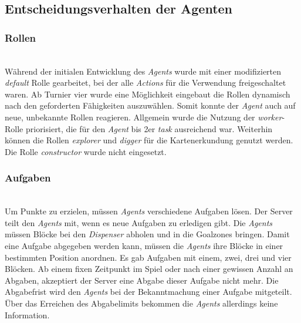 \subsection{Entscheidungsverhalten der Agenten} \label{kap:entscheidungAgenten}

\subsubsection{Rollen} ~\\
Während der initialen Entwicklung des \textit{Agents} wurde mit einer modifizierten \textit{default} Rolle gearbeitet, bei der alle \textit{Actions} für die Verwendung freigeschaltet waren. Ab Turnier vier wurde eine Möglichkeit eingebaut die Rollen dynamisch nach den geforderten Fähigkeiten auszuwählen. 
Somit konnte der \textit{Agent} auch auf neue, unbekannte Rollen reagieren. Allgemein wurde die Nutzung der \textit{worker}-Rolle priorisiert, die für den \textit{Agent} bis 2er \textit{task} ausreichend war. Weiterhin können die Rollen  \textit{explorer} und  \textit{digger} für die Kartenerkundung genutzt werden. Die Rolle \textit{constructor} wurde nicht eingesetzt.

\subsubsection{Aufgaben} ~\\
Um Punkte zu erzielen, müssen \textit{Agents} verschiedene Aufgaben lösen. Der Server teilt den \textit{Agents} mit, wenn es neue Aufgaben zu erledigen gibt. Die \textit{Agents} müssen Blöcke bei den \textit{Dispenser} abholen und in die Goalzones bringen. Damit eine Aufgabe abgegeben werden kann, müssen die \textit{Agents} ihre Blöcke in einer bestimmten Position anordnen. Es gab Aufgaben mit einem, zwei, drei und vier Blöcken. Ab einem fixen Zeitpunkt im Spiel oder nach einer gewissen Anzahl an Abgaben, akzeptiert der Server eine Abgabe dieser Aufgabe nicht mehr. Die Abgabefrist wird den \textit{Agents} bei der Bekanntmachung einer Aufgabe mitgeteilt. Über das Erreichen des Abgabelimits bekommen die \textit{Agents} allerdings keine Information.\newline

